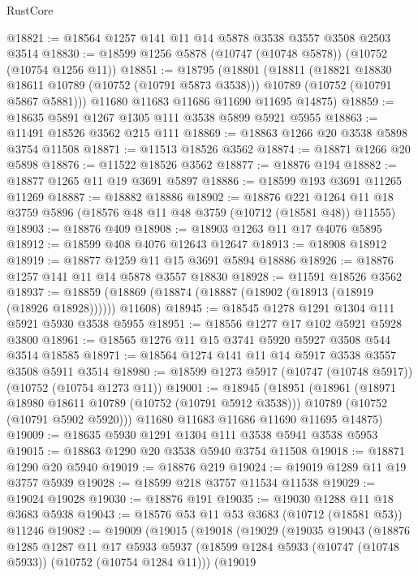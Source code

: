 \begin{lexlean}{RustCore}
\begin{coremodule}
@18821 := @18564 @1257 @141 @11 @14 @5878 @3538 @3557 @3508 @2503 @3514
@18830 := @18599 @1256 @5878 (@10747 (@10748 @5878)) (@10752 (@10754 @1256 @11))
@18851 := @18795
    (@18801
      (@18811
        (@18821 @18830 @18611 @10789 (@10752 (@10791 @5873 @3538)))
        @10789
        (@10752 (@10791 @5867 @5881)))
      @11680
      @11683
      @11686
      @11690
      @11695
      @14875)
@18859 := @18635 @5891 @1267 @1305 @111 @3538 @5899 @5921 @5955
@18863 := @11491 @18526 @3562 @215 @111
@18869 := @18863 @1266 @20 @3538 @5898 @3754 @11508
@18871 := @11513 @18526 @3562
@18874 := @18871 @1266 @20 @5898
@18876 := @11522 @18526 @3562
@18877 := @18876 @194
@18882 := @18877 @1265 @11 @19 @3691 @5897
@18886 := @18599 @193 @3691 @11265 @11269
@18887 := @18882 @18886
@18902 := @18876
    @221
    @1264
    @11
    @18
    @3759
    @5896
    (@18576 @48 @11 @48 @3759 (@10712 (@18581 @48)) @11555)
@18903 := @18876 @409
@18908 := @18903 @1263 @11 @17 @4076 @5895
@18912 := @18599 @408 @4076 @12643 @12647
@18913 := @18908 @18912
@18919 := @18877 @1259 @11 @15 @3691 @5894 @18886
@18926 := @18876 @1257 @141 @11 @14 @5878 @3557 @18830
@18928 := @11591 @18526 @3562
@18937 := @18859 (@18869 (@18874 (@18887 (@18902 (@18913 (@18919 (@18926 @18928)))))) @11608)
@18945 := @18545 @1278 @1291 @1304 @111 @5921 @5930 @3538 @5955
@18951 := @18556 @1277 @17 @102 @5921 @5928 @3800
@18961 := @18565 @1276 @11 @15 @3741 @5920 @5927 @3508 @544 @3514 @18585
@18971 := @18564 @1274 @141 @11 @14 @5917 @3538 @3557 @3508 @5911 @3514
@18980 := @18599 @1273 @5917 (@10747 (@10748 @5917)) (@10752 (@10754 @1273 @11))
@19001 := @18945
    (@18951
      (@18961
        (@18971 @18980 @18611 @10789 (@10752 (@10791 @5912 @3538)))
        @10789
        (@10752 (@10791 @5902 @5920)))
      @11680
      @11683
      @11686
      @11690
      @11695
      @14875)
@19009 := @18635 @5930 @1291 @1304 @111 @3538 @5941 @3538 @5953
@19015 := @18863 @1290 @20 @3538 @5940 @3754 @11508
@19018 := @18871 @1290 @20 @5940
@19019 := @18876 @219
@19024 := @19019 @1289 @11 @19 @3757 @5939
@19028 := @18599 @218 @3757 @11534 @11538
@19029 := @19024 @19028
@19030 := @18876 @191
@19035 := @19030 @1288 @11 @18 @3683 @5938
@19043 := @18576 @53 @11 @53 @3683 (@10712 (@18581 @53)) @11246
@19082 := @19009
    (@19015
      (@19018
        (@19029
          (@19035
            @19043
            (@18876
              @1285
              @1287
              @11
              @17
              @5933
              @5937
              (@18599 @1284 @5933 (@10747 (@10748 @5933)) (@10752 (@10754 @1284 @11)))
              (@19019

\end{coremodule}
\end{lexlean}
